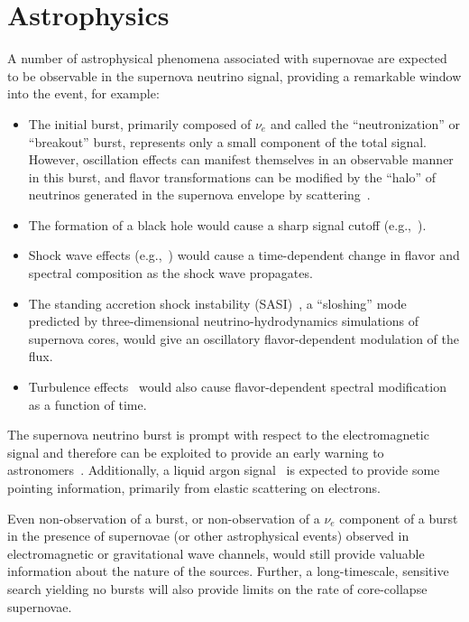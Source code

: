 \section{Astrophysics}
\label{sec:physics-snblowe-astrophysics}



A number of astrophysical phenomena associated with supernovae are expected to be observable
in the supernova neutrino signal, providing a remarkable window into the event, for example: 
\begin{itemize}
\item The initial burst, primarily composed of $\nu_e$ and called the
  ``neutronization'' or ``breakout''
  burst, %
  represents only a small component of the total signal.  However,
  oscillation effects can manifest themselves in an observable manner
  in this burst, and flavor transformations can be modified by the
  ``halo'' of neutrinos generated in the supernova envelope by
  scattering~\cite{Cherry:2013mv}.
\item The formation of a black hole would cause a sharp signal cutoff
  (e.g.,~\cite{Beacom:2000qy,Fischer:2008rh}).
\item Shock wave effects (e.g.,~\cite{Schirato:2002tg}) would cause a
  time-dependent change in flavor and spectral composition as the
  shock wave propagates.
\item The standing accretion shock instability
  (SASI)~\cite{Hanke:2011jf,Hanke:2013ena}, a ``sloshing'' mode
  predicted by three-dimensional neutrino-hydrodynamics simulations of
  supernova cores, would give an oscillatory flavor-dependent
  modulation of the flux.
\item Turbulence effects~\cite{Friedland:2006ta,Lund:2013uta} would
  also cause flavor-dependent spectral modification as a function of
  time.
\end{itemize}

The supernova neutrino burst is prompt with respect to the
electromagnetic signal and therefore can be exploited to provide an
early warning to astronomers~\cite{Antonioli:2004zb,Scholberg:2008fa}.
Additionally, a liquid argon signal~\cite{Bueno:2003ei} is expected to
provide some pointing information, primarily from elastic scattering
on electrons.

Even non-observation of a burst, or non-observation of
a $\nu_e$ component of a burst in the presence of supernovae (or other
astrophysical events) observed in electromagnetic or gravitational
wave channels, would still provide valuable information about the
nature of the sources.  Further, a long-timescale, sensitive search
yielding no bursts will also provide limits on the rate of
core-collapse supernovae.


